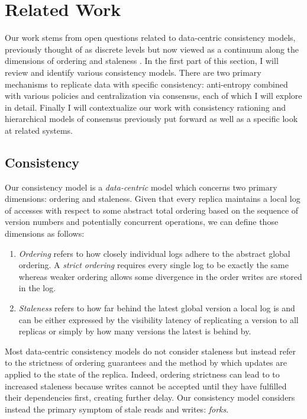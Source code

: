 \documentclass{article}
\begin{document}
\section{Related Work}

Our work stems from open questions related to data-centric consistency models, previously thought of as discrete levels but now viewed as a continuum along the dimensions of ordering and staleness \cite{bermbach_consistency_2013}. In the first part of this section, I will review and identify various consistency models. There are two primary mechanisms to replicate data with specific consistency: anti-entropy combined with various policies and centralization via consensus, each of which I will explore in detail. Finally I will contextualize our work with consistency rationing and hierarchical models of consensus previously put forward as well as a specific look at related systems.

\subsection{Consistency}


Our consistency model is a \textit{data-centric} model which concerns two primary dimensions: ordering and staleness. Given that every replica maintains a local log of accesses with respect to some abstract total ordering based on the sequence of version numbers and potentially concurrent operations, we can define those dimensions as follows:

\begin{enumerate}
    \item \textit{Ordering} refers to how closely individual logs adhere to the abstract global ordering. A \textit{strict ordering} requires every single log to be exactly the same whereas weaker ordering allows some divergence in the order writes are stored in the log.
    \item \textit{Staleness} refers to how far behind the latest global version a local log is and can be either expressed by the visibility latency of replicating a version to all replicas or simply by how many versions the latest is behind by.
\end{enumerate}

Most data-centric consistency models do not consider staleness but instead refer to the strictness of ordering guarantees and the method by which updates are applied to the state of the replica. Indeed, ordering strictness can lead to to increased staleness because writes cannot be accepted until they have fulfilled their dependencies first, creating further delay. Our consistency model considers instead the primary symptom of stale reads and writes: \textit{forks}.
\end{document}
